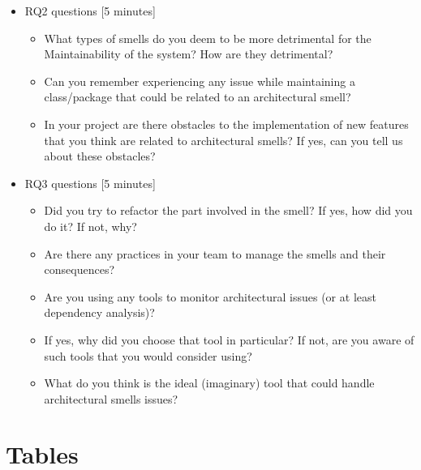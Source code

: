 \begin{itemize}
    \item RQ2 questions [5 minutes]
    \begin{itemize}
        \item What types of smells do you deem to be more detrimental for the Maintainability of the system? How are they detrimental?
        \item Can you remember experiencing any issue while maintaining a class/package that could be related to an architectural smell?
        \item In your project are there  obstacles to the implementation of new features that you think are related to architectural smells? If yes, can you tell us about these obstacles?
    \end{itemize}

    \item RQ3 questions [5 minutes]
    \begin{itemize}
        \item Did you try to refactor the part involved in the smell? If yes, how did you do it? If not, why?
        \item Are there any practices in your team to manage the smells and their consequences?
        \item Are you using any tools to monitor architectural issues (or at least dependency analysis)? 
        \item If yes, why did you choose that tool in particular? If not, are you aware of such tools that you would consider using? 
        \item What do you think is the ideal (imaginary) tool that could handle architectural smells issues?
    \end{itemize}
\end{itemize}

\section{Tables}


